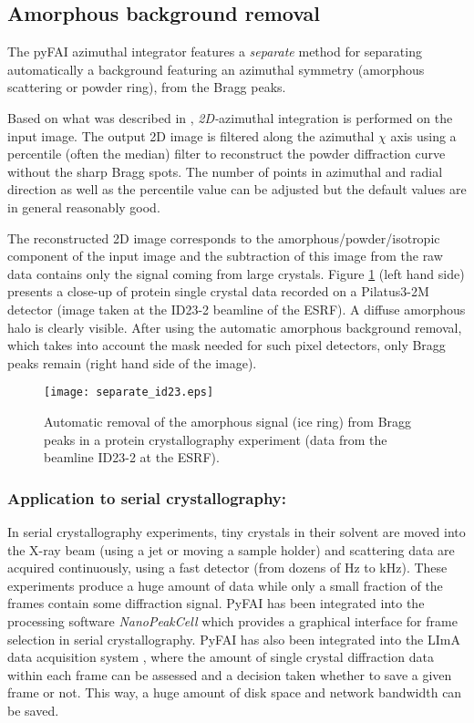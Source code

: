\documentclass{iucr}
\begin{document}
\subsection{Amorphous background removal}

The pyFAI azimuthal integrator features a \textit{separate} method for
separating automatically a background featuring an azimuthal symmetry
(amorphous scattering or powder ring), from the Bragg peaks.

Based on what was described in \cite{PyFAI_PDJ}, \textit{2D-}azimuthal
integration is performed on the input image.
The output 2D image is filtered along the azimuthal $\chi$ axis using a
percentile (often the median) filter to reconstruct the powder diffraction curve
without the sharp Bragg spots.
The number of points in azimuthal and radial direction as well as
the percentile value can be adjusted but the default values are in
general reasonably good.

The reconstructed 2D image corresponds to the amorphous/powder/isotropic
component of the input image and the subtraction of this image from
the raw data contains only the signal coming from large crystals.
Figure \ref{separate} (left hand side)
presents a close-up of protein single crystal data recorded on a Pilatus3-2M
detector (image taken at the ID23-2 beamline of the ESRF).
A diffuse amorphous halo is clearly visible.
After using the automatic amorphous background removal, which takes into account
the mask needed for such pixel detectors, only Bragg peaks remain (right hand
side of the image).

\begin{figure}
\label{separate}
\begin{center}
\texttt{[image: separate\_id23.eps]}
\caption{Automatic removal of the amorphous signal (ice ring) from Bragg peaks
in a protein crystallography experiment (data from the beamline ID23-2 at
the ESRF).}
\end{center}
\end{figure}

\subsubsection{Application to serial crystallography:}
In serial crystallography experiments, tiny crystals in their solvent are moved
into the X-ray beam (using a jet or moving a sample holder) and scattering
data are acquired continuously, using a fast detector (from dozens of Hz to kHz).
These experiments produce a huge amount of data while only a small fraction of the
frames contain some diffraction signal.
PyFAI has been integrated into the processing software \textit{NanoPeakCell}
which provides a graphical interface for frame selection in serial crystallography.
PyFAI has also been integrated into the LImA data acquisition system
\cite{lima}, where the amount of single crystal diffraction data within each
frame can be assessed and a decision taken whether to save a given frame or
not.
This way, a huge amount of disk space and network bandwidth
can be saved.
\end{document}

